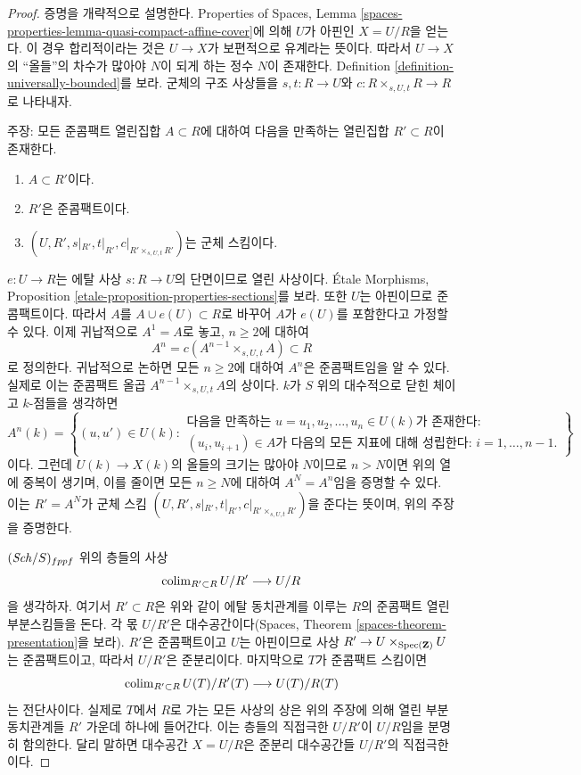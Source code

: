 \begin{proof}
증명을 개략적으로 설명한다. Properties of Spaces, Lemma
\ref{spaces-properties-lemma-quasi-compact-affine-cover}에 의해
$U$가 아핀인 $X = U/R$을 얻는다. 이 경우 합리적이라는 것은
$U \to X$가 보편적으로 유계라는 뜻이다. 따라서 $U \to X$의
“올들”의 차수가 많아야 $N$이 되게 하는 정수 $N$이 존재한다.
Definition \ref{definition-universally-bounded}를 보라.
군체의 구조 사상들을 $s, t : R \to U$와
$c : R \times_{s, U, t} R \to R$로 나타내자.

\medskip\noindent
주장: 모든 준콤팩트 열린집합 $A \subset R$에 대하여 다음을 만족하는
열린집합 $R' \subset R$이 존재한다.
\begin{enumerate}
\item $A \subset R'$이다.
\item $R'$은 준콤팩트이다.
\item $(U, R', s|_{R'}, t|_{R'}, c|_{R' \times_{s, U, t} R'})$는
군체 스킴이다.
\end{enumerate}
$e : U \to R$는 에탈 사상 $s : R \to U$의 단면이므로 열린 사상이다.
\'Etale Morphisms, Proposition
\ref{etale-proposition-properties-sections}를 보라. 또한 $U$는
아핀이므로 준콤팩트이다. 따라서 $A$를 $A \cup e(U) \subset R$로
바꾸어 $A$가 $e(U)$를 포함한다고 가정할 수 있다.
이제 귀납적으로 $A^1 = A$로 놓고, $n \geq 2$에 대하여
$$
A^n = c(A^{n - 1} \times_{s, U, t} A) \subset R
$$
로 정의한다. 귀납적으로 논하면 모든 $n \geq 2$에 대하여 $A^n$은
준콤팩트임을 알 수 있다. 실제로 이는 준콤팩트 올곱
$A^{n - 1} \times_{s, U, t} A$의 상이다. $k$가 $S$ 위의 대수적으로
닫힌 체이고 $k$-점들을 생각하면
$$
A^n(k) = \left\{(u, u') \in U(k)
:
\begin{matrix}
\text{다음을 만족하는 } u = u_1, u_2, \ldots, u_n \in U(k)\text{가 존재한다:} \\
(u_i , u_{i + 1}) \in A\text{가 다음의 모든 지표에 대해 성립한다: }i = 1, \ldots, n - 1.
\end{matrix}
\right\}
$$
이다. 그런데 $U(k) \to X(k)$의 올들의 크기는 많아야 $N$이므로
$n > N$이면 위의 열에 중복이 생기며, 이를 줄이면 모든 $n \geq N$에
대하여 $A^N = A^n$임을 증명할 수 있다.
이는 $R' = A^N$가 군체 스킴
$(U, R', s|_{R'}, t|_{R'}, c|_{R' \times_{s, U, t} R'})$을 준다는
뜻이며, 위의 주장을 증명한다.

\medskip\noindent
$(\mathit{Sch}/S)_{fppf}$ 위의 층들의 사상
$$
\mathop{\mathrm{colim}}\nolimits_{R' \subset R} U/R' \longrightarrow U/R
$$
을 생각하자. 여기서 $R' \subset R$은 위와 같이 에탈 동치관계를
이루는 $R$의 준콤팩트 열린 부분스킴들을 돈다. 각 몫 $U/R'$은
대수공간이다(Spaces, Theorem
\ref{spaces-theorem-presentation}을 보라). $R'$은 준콤팩트이고
$U$는 아핀이므로 사상
$R' \to U \times_{\mathop{\mathrm{Spec}}(\mathbf{Z})} U$는 준콤팩트이고, 따라서
$U/R'$은 준분리이다. 마지막으로 $T$가 준콤팩트 스킴이면
$$
\mathop{\mathrm{colim}}\nolimits_{R' \subset R} U(T)/R'(T) \longrightarrow U(T)/R(T)
$$
는 전단사이다. 실제로 $T$에서 $R$로 가는 모든 사상의 상은 위의
주장에 의해 열린 부분동치관계들 $R'$ 가운데 하나에 들어간다.
이는 층들의 직접극한 $U/R'$이 $U/R$임을 분명히 함의한다.
달리 말하면 대수공간 $X = U/R$은 준분리 대수공간들 $U/R'$의
직접극한이다.


\end{proof}
